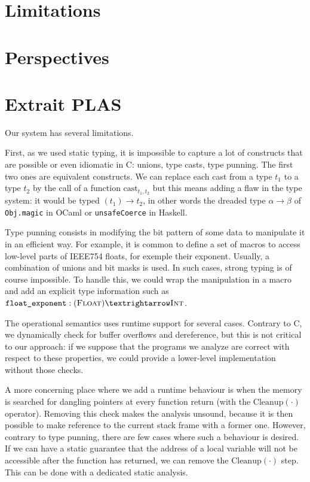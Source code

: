 \section{Limitations}

\section{Perspectives}

\section*{Extrait PLAS}

Our system has several limitations.

First, as we used static typing, it is impossible to capture a lot of constructs
that are possible or even idiomatic in C: unions, type casts, type punning. The
first two ones are equivalent constructs. We can replace each cast from a type
$t_1$ to a type $t_2$ by the call of a function $\mathrm{cast}_{t_1,t_2}$ but
this means adding a flaw in the type system: it would be typed $(t_1) → t_2$,
in other words the dreaded type $α → β$ of \texttt{Obj.magic} in OCaml
or \texttt{unsafeCoerce} in Haskell.

Type punning consists in modifying the bit pattern of some data to manipulate it
in an efficient way. For example, it is common to define a set of macros to
access low-level parts of IEEE754 floats, for exemple their exponent. Usually, a
combination of unions and bit masks is used. In such cases, strong typing is of
course impossible. To handle this, we could wrap the manipulation in a macro and
add an explicit type information such as $\texttt{float\_exponent} : (\tFloat) →
\tInt$.

The operational semantics uses runtime support for several cases. Contrary to C,
we dynamically check for buffer overflows and \eNull dereference, but this is
not critical to our approach: if we suppose that the programs we analyze are
correct with respect to these properties, we could provide a lower-level
implementation without those checks.

A more concerning place where we add a runtime behaviour is when the memory is
searched for dangling pointers at every function return (with the
$\mathrm{Cleanup(\cdot)}$ operator). Removing this check makes the analysis
unsound, because it is then possible to make reference to the current stack
frame with a former one. However, contrary to type punning, there are few cases
where such a behaviour is desired. If we can have a static guarantee that the
address of a local variable will not be accessible after the function has
returned, we can remove the $\mathrm{Cleanup(\cdot)}$ step. This can be done
with a dedicated static analysis\cite{ifm10}.

